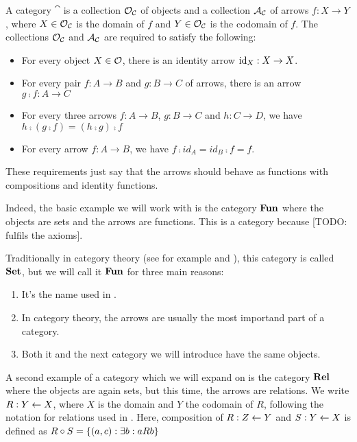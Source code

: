 \documentclass{article}
\begin{document}
\begin{Def}
A category $\cat$ is a collection $\mathcal{O}_{\mathcal{C}}$ of objects and a collection $\mathcal{A}_{\mathcal{C}}$ of arrows $f : X \to Y$, where $X \in \mathcal{O}_{\mathcal{C}}$ is the domain of $f$ and $Y \in \mathcal{O}_{\mathcal{C}}$ is the codomain of $f$. 
The collections $\mathcal{O}_{\mathcal{C}}$ and $\mathcal{A}_{\mathcal{C}}$ are required to satisfy the following:
\begin{itemize}
\item For every object $X \in \mathcal{O}$, there is an identity arrow $\operatorname{id}_X : X \to X$.
\item For every pair $f : A \to B$ and $g : B \to C$ of arrows, there is an arrow $g \comp f : A \to C$
\item For every three arrows $f : A \to B$, $g : B \to C$ and $h : C \to D$, we have $h \comp (g \comp f) = (h \comp g) \comp f$
\item For every arrow $f : A \to B$, we have $f \comp id_A = id_B \comp f = f$. 
\end{itemize}
\end{Def}

These requirements just say that the arrows should behave as functions with compositions and identity functions.

\begin{Ex}
Indeed, the basic example we will work with is the category $\mathbf{Fun}$ where the objects are sets and the arrows are functions. This is a category because [TODO: fulfils the axioms].
\end{Ex}

Traditionally in category theory (see for example \cite{Awodey} and \cite{MacLane}), this category is called $\mathbf{Set}$, but we will call it $\mathbf{Fun}$ for three main reasons: 
\begin{enumerate}
\item It's the name used in \cite{AoP}.
\item In category theory, the arrows are usually the most importand part of a category.
\item Both it and the next category we will introduce have the same objects.
\end{enumerate}
\begin{Ex}
A second example of a category which we will expand on is the category $\mathbf{Rel}$ where the objects are again sets, but this time, the arrows are relations. 
We write $R : Y \leftarrow X$, where $X$ is the domain and $Y$ the codomain of $R$, following the notation for relations used in \cite{AoPA}. 
Here, composition of $R : Z \leftarrow Y$ and $S : Y \leftarrow X$ is defined as $R \circ S = \{(a, c) : \exists b : a R b \}$ 
\end{Ex}
\end{document}
